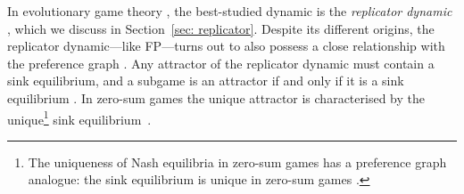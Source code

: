 \documentclass[preprint,authoryear]{elsarticle}
\begin{document}
\begin{comment}
While often presented as a payoff matrix \citep{krishna_convergence_1998,jordan_three_1993,gaunersdorfer_fictitious_1995}, Shapley himself defined this game by a specific ordering of the strategies for each player---that is, a \emph{preference graph}---demonstrating that the obstacle to convergence was graph-theoretic. %
Later, \cite{monderer_fictitious_1997} and \cite{berger_two_2007, berger_browns_2007} studied `improvement principles' for FP, which explain how the preference graph constrains FP sequences. \cite{krishna_convergence_1998} significantly generalise Shapley's results by examining \emph{cycles} in FP sequences, proving that if FP enters a cycle of profiles longer than 4, the mixed strategies cannot converge. In Shapley's game, all paths in the preference graph lead to a single sink equilibrium, which is a 6-cycle (Figure~\ref{fig:shapley}). %
The `improvement principles' \citep{monderer_fictitious_1997,berger_two_2007} force FP paths to follow this 6-cycle, which explains the observed non-convergence. A similar non-FP-convergent $2\times 2\times 2$ game was introduced by \cite{jordan_three_1993}, where, again, all paths lead into a 6-cycle. This game is sometimes called \emph{Mismatching Pennies}~\citep{sandholm2010population, kleinberg_beyond_2011}. We show that, like Shapley's game, the non-convergence to equilibria in Jordan's game derives from its preference graph: FP does not converge to Nash equilibria in any game with this graph---instead, it converges to the sink equilibrium. The non-convergence to Nash equilibria in Jordan's game is a key component of the work of \citeauthor{kleinberg_beyond_2011}, who show that the social welfare on this 6-cycle in Jordan's game can be arbitrarily higher than at the Nash equilibrium.%
\end{comment}
In evolutionary game theory \citep{smith1973logic}, the best-studied dynamic is the \emph{replicator dynamic} \citep{taylor_evolutionary_1978}, which we discuss in Section~\ref{sec: replicator}. Despite its different origins, the replicator dynamic---like FP---turns out to also possess a close relationship with the preference graph \citep{papadimitriou_game_2019,biggar_replicator_2023,biggar_attractor_2024}. Any attractor of the replicator dynamic must contain a sink equilibrium, and a subgame is an attractor if and only if it is a sink equilibrium \citep{gaunersdorfer_fictitious_1995,biggar_replicator_2023}. In zero-sum games the unique attractor is characterised by the unique\footnote{The uniqueness of Nash equilibria in zero-sum games has a preference graph analogue: the sink equilibrium is unique in zero-sum games \citep{biggar_graph_2023}.} sink equilibrium~\citep{biggar_attractor_2024}.
\end{document}
